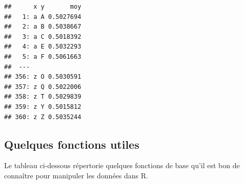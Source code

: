 \documentclass[
  11pt,
]{book}
\numberwithin{equation}{section}
\numberwithin{countremarque}{section}
\begin{document}
\begin{lstlisting}
##      x y       moy
##   1: a A 0.5027694
##   2: a B 0.5038667
##   3: a C 0.5018392
##   4: a E 0.5032293
##   5: a F 0.5061663
##  ---              
## 356: z O 0.5030591
## 357: z Q 0.5022006
## 358: z T 0.5029839
## 359: z Y 0.5015812
## 360: z Z 0.5035244
\end{lstlisting}

\hypertarget{quelques-fonctions-utiles}{%
\subsection{Quelques fonctions utiles}\label{quelques-fonctions-utiles}}

Le tableau ci-dessous répertorie quelques fonctions de base qu'il est bon de connaître pour manipuler les données dans R.
\end{document}
